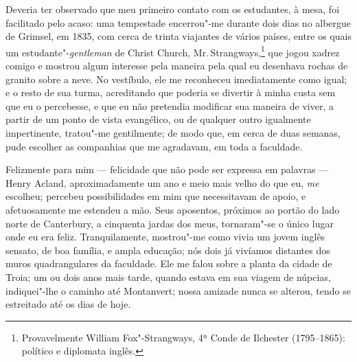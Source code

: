Deveria ter observado que meu primeiro contato com os estudantes, à
mesa, foi facilitado pelo acaso: uma tempestade encerrou"-me durante dois
dias no albergue de Grimsel, em 1835, com cerca de trinta viajantes de
vários países, entre os quais um estudante"-\textit{gentleman} de Christ
Church, Mr.\,Strangways,\footnote{Provavelmente William Fox"-Strangways, 4ª
  Conde de Ilchester (1795--1865): político e diplomata inglês.} que jogou xadrez comigo e mostrou algum interesse pela
maneira pela qual eu desenhava rochas de granito sobre a neve. No
vestíbulo, ele me reconheceu imediatamente como igual; e o resto de sua
turma, acreditando que poderia se divertir à minha custa sem que eu o
percebesse, e que eu não pretendia modificar sua maneira de viver, a
partir de um ponto de vista evangélico, ou de qualquer outro igualmente
impertinente, tratou"-me gentilmente; de modo que, em cerca de duas
semanas, pude escolher as companhias que me agradavam, em toda a
faculdade.

Felizmente para mim --- felicidade que não pode ser expressa em palavras
--- Henry Acland, aproximadamente um ano e meio mais velho do que eu,
\textit{me} escolheu; percebeu possibilidades em mim que necessitavam de
apoio, e afetuosamente me estendeu a mão. Seus aposentos, próximos ao
portão do lado norte de Canterbury, a cinquenta jardas dos meus,
tornaram"-se o único lugar onde eu era feliz. Tranquilamente, mostrou"-me
como vivia um jovem inglês sensato, de boa família, e ampla educação;
nós dois já vivíamos distantes dos muros quadrangulares da faculdade.
Ele me falou sobre a planta da cidade de Troia; um ou dois anos mais
tarde, quando estava em sua viagem de núpcias, indiquei"-lhe o caminho
até Montanvert; nossa amizade nunca se alterou, tendo se estreitado até
os dias de hoje.

